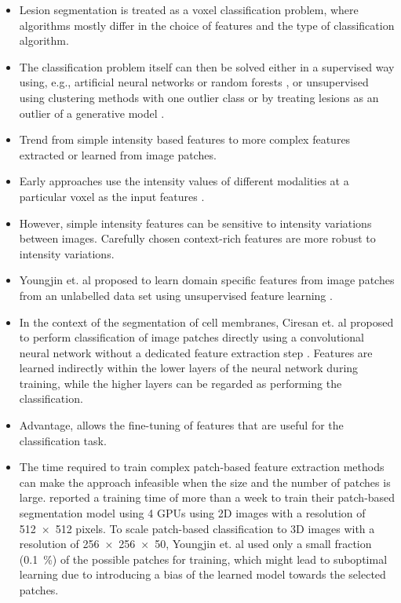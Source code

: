 \begin{itemize}

\item Lesion segmentation is treated as a voxel classification problem, where
algorithms mostly differ in the choice of features and the type of
classification algorithm.

\item The classification problem itself can then be solved either in a
supervised way using, e.g., artificial neural networks \cite{zijdenbos1994} or
random forests \cite{geremia2010}, or unsupervised using clustering methods with
one outlier class \cite{souplet2008} or by treating lesions as an outlier of a
generative model \cite{weiss2013}.

\item Trend from simple intensity based features to more complex features
extracted or learned from image patches.
  
\item Early approaches use the intensity values of different modalities at a
particular voxel as the input features \cite{zijdenbos1994}.

\item However, simple intensity features can be sensitive to intensity
variations between images. Carefully chosen context-rich features are more
robust \cite{geremia2010} to intensity variations.

\item Youngjin et. al proposed to learn domain specific features
from image patches from an unlabelled data set using unsupervised feature
learning \cite{yoo2014}.

\item In the context of the segmentation of cell membranes, Ciresan et. al
proposed to perform classification of image patches directly using a
convolutional neural network without a dedicated feature extraction step
\cite{Ciresan2012}. Features are learned indirectly within the lower layers of
the neural network during training, while the higher layers can be regarded as
performing the classification.

\item Advantage, allows the fine-tuning of features that are useful for the
classification task.

\item The time required to train complex patch-based feature extraction methods
can make the approach infeasible when the size and the number of patches is
large. \cite{Ciresan2012} reported a training time of more than a week to train
their patch-based segmentation model using 4 GPUs using 2D images with a
resolution of \num{512x512} pixels. To scale patch-based classification to 3D
images with a resolution of \num{256x256x50}, Youngjin et.
al used only a small fraction (\SI{0.1}{\percent}) of the possible patches for
training, which might lead to suboptimal learning due to introducing a bias of
the learned model towards the selected patches.

\end{itemize}

